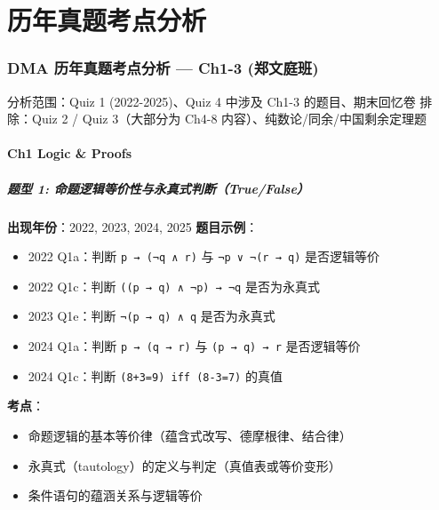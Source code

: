 \documentclass[10pt,a4paper,openany]{ctexbook}
\theoremstyle{definition}
\theoremstyle{remark}
\renewenvironment{quote}
  {\list{}{\leftmargin=1em\rightmargin=0pt\topsep=0.5pt\partopsep=0pt}\item[]}
  {\endlist}
\begin{document}
\newpage


\part{历年真题考点分析}

\section{DMA 历年真题考点分析 — Ch1-3 (郑文庭班)}

\begin{quote}
分析范围：Quiz 1 (2022-2025)、Quiz 4 中涉及 Ch1-3 的题目、期末回忆卷
排除：Quiz 2 / Quiz 3（大部分为 Ch4-8 内容）、纯数论/同余/中国剩余定理题

\end{quote}
\vspace{-2pt}

\subsection{Ch1 Logic \& Proofs}

\vspace{-2pt}

\subsubsection{题型 1: 命题逻辑等价性与永真式判断（True/False）}

\textbf{出现年份}：2022, 2023, 2024, 2025
\textbf{题目示例}：
\begin{itemize}
\item 2022 Q1a：判断 \texttt{p → (¬q ∧ r)} 与 \texttt{¬p ∨ ¬(r → q)} 是否逻辑等价
\item 2022 Q1c：判断 \texttt{((p → q) ∧ ¬p) → ¬q} 是否为永真式
\item 2023 Q1e：判断 \texttt{¬(p → q) ∧ q} 是否为永真式
\item 2024 Q1a：判断 \texttt{p → (q → r)} 与 \texttt{(p → q) → r} 是否逻辑等价
\item 2024 Q1c：判断 \texttt{(8+3=9) iff (8-3=7)} 的真值

\end{itemize}

\textbf{考点}：
\begin{itemize}
\item 命题逻辑的基本等价律（蕴含式改写、德摩根律、结合律）
\item 永真式（tautology）的定义与判定（真值表或等价变形）
\item 条件语句的蕴涵关系与逻辑等价

\end{itemize}
\end{document}
